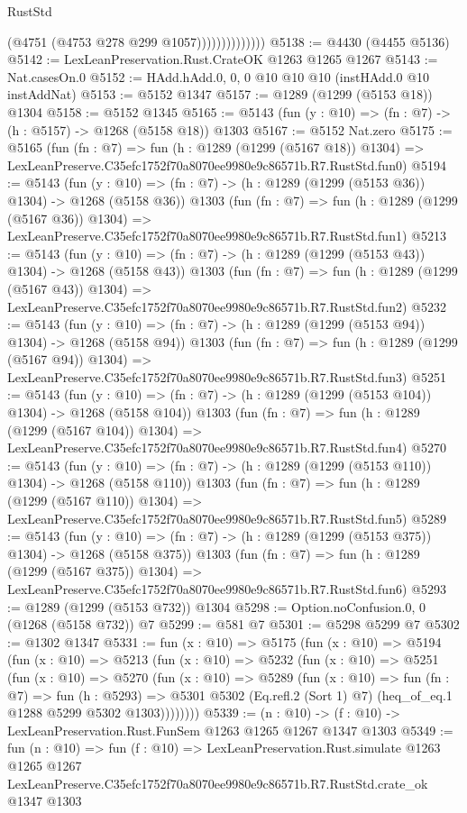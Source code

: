 \begin{lexlean}{RustStd}
\begin{coremodule}
                            (@4751 (@4753 @278 @299 @1057))))))))))))))
@5138 := @4430 (@4455 @5136)
@5142 := LexLeanPreservation.Rust.CrateOK @1263 @1265 @1267
@5143 := Nat.casesOn.{0}
@5152 := HAdd.hAdd.{0, 0, 0} @10 @10 @10 (instHAdd.{0} @10 instAddNat)
@5153 := @5152 @1347
@5157 := @1289 (@1299 (@5153 @18)) @1304
@5158 := @5152 @1345
@5165 := @5143 (fun (y : @10) => (fn : @7) -> (h : @5157) -> @1268 (@5158 @18)) @1303
@5167 := @5152 Nat.zero
@5175 := @5165
    (fun (fn : @7) =>
    fun (h : @1289 (@1299 (@5167 @18)) @1304) =>
    LexLeanPreserve.C35efc1752f70a8070ee9980e9c86571b.R7.RustStd.fun0)
@5194 := @5143
    (fun (y : @10) => (fn : @7) -> (h : @1289 (@1299 (@5153 @36)) @1304) -> @1268 (@5158 @36))
    @1303
    (fun (fn : @7) =>
    fun (h : @1289 (@1299 (@5167 @36)) @1304) =>
    LexLeanPreserve.C35efc1752f70a8070ee9980e9c86571b.R7.RustStd.fun1)
@5213 := @5143
    (fun (y : @10) => (fn : @7) -> (h : @1289 (@1299 (@5153 @43)) @1304) -> @1268 (@5158 @43))
    @1303
    (fun (fn : @7) =>
    fun (h : @1289 (@1299 (@5167 @43)) @1304) =>
    LexLeanPreserve.C35efc1752f70a8070ee9980e9c86571b.R7.RustStd.fun2)
@5232 := @5143
    (fun (y : @10) => (fn : @7) -> (h : @1289 (@1299 (@5153 @94)) @1304) -> @1268 (@5158 @94))
    @1303
    (fun (fn : @7) =>
    fun (h : @1289 (@1299 (@5167 @94)) @1304) =>
    LexLeanPreserve.C35efc1752f70a8070ee9980e9c86571b.R7.RustStd.fun3)
@5251 := @5143
    (fun (y : @10) => (fn : @7) -> (h : @1289 (@1299 (@5153 @104)) @1304) -> @1268 (@5158 @104))
    @1303
    (fun (fn : @7) =>
    fun (h : @1289 (@1299 (@5167 @104)) @1304) =>
    LexLeanPreserve.C35efc1752f70a8070ee9980e9c86571b.R7.RustStd.fun4)
@5270 := @5143
    (fun (y : @10) => (fn : @7) -> (h : @1289 (@1299 (@5153 @110)) @1304) -> @1268 (@5158 @110))
    @1303
    (fun (fn : @7) =>
    fun (h : @1289 (@1299 (@5167 @110)) @1304) =>
    LexLeanPreserve.C35efc1752f70a8070ee9980e9c86571b.R7.RustStd.fun5)
@5289 := @5143
    (fun (y : @10) => (fn : @7) -> (h : @1289 (@1299 (@5153 @375)) @1304) -> @1268 (@5158 @375))
    @1303
    (fun (fn : @7) =>
    fun (h : @1289 (@1299 (@5167 @375)) @1304) =>
    LexLeanPreserve.C35efc1752f70a8070ee9980e9c86571b.R7.RustStd.fun6)
@5293 := @1289 (@1299 (@5153 @732)) @1304
@5298 := Option.noConfusion.{0, 0} (@1268 (@5158 @732)) @7
@5299 := @581 @7
@5301 := @5298 @5299 @7
@5302 := @1302 @1347
@5331 := fun (x : @10) =>
  @5175
    (fun (x : @10) =>
    @5194
      (fun (x : @10) =>
      @5213
        (fun (x : @10) =>
        @5232
          (fun (x : @10) =>
          @5251
            (fun (x : @10) =>
            @5270
              (fun (x : @10) =>
              @5289
                (fun (x : @10) =>
                fun (fn : @7) =>
                fun (h : @5293) =>
                @5301 @5302 (Eq.refl.{2} (Sort 1) @7) (heq_of_eq.{1} @1288 @5299 @5302 @1303))))))))
@5339 := (n : @10) -> (f : @10) -> LexLeanPreservation.Rust.FunSem @1263 @1265 @1267 @1347 @1303
@5349 := fun (n : @10) =>
  fun (f : @10) =>
  LexLeanPreservation.Rust.simulate
    @1263
    @1265
    @1267
    LexLeanPreserve.C35efc1752f70a8070ee9980e9c86571b.R7.RustStd.crate_ok
    @1347
    @1303
\end{coremodule}
\end{lexlean}
